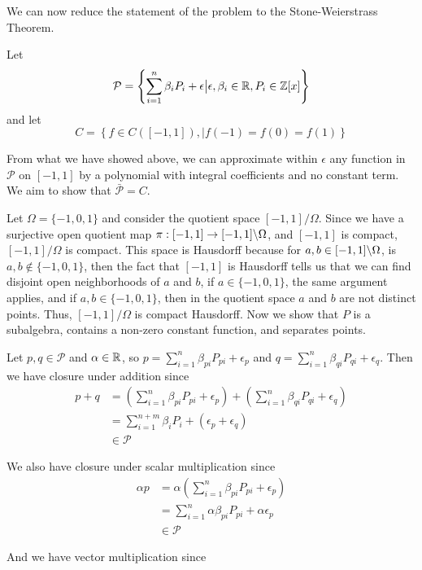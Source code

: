 \documentclass{hmwk}
\begin{document}
\begin{solution}
\pre We can now reduce the statement of the problem to the Stone-Weierstrass Theorem. 

\pre Let $$\mathcal{P} = \left\{\sum_{i = 1}^n \beta_iP_i + \epsilon \big| \epsilon, \beta_i \in \mathbb{R}, P_i \in \mathbb{Z}[x] \right\}$$ 
\pre and let $$C = \left\{ f \in C([-1, 1]), 
\big| f(-1) = f(0) = f(1)\right\}$$

\pre From what we have showed above, we can approximate within $\epsilon$ any function in $\mathcal{P}$ on $[-1, 1]$ by a polynomial with integral coefficients and no constant term. We aim to show that $\bar{\mathcal{P}} = C$.

\pre Let $\Omega = \{-1, 0, 1\}$ and consider the quotient space $[-1, 1]/\Omega$. Since we have a surjective open quotient map $\pi: [-1, 1] \rightarrow [-1, 1]\backslash\Omega$, and $[-1, 1]$ is compact, $[-1, 1]/\Omega$ is compact. This space is Hausdorff because for $a, b \in [-1, 1]\backslash\Omega$, is $a, b \notin \{-1, 0, 1\}$, then the fact that $[-1, 1]$ is Hausdorff tells us that we can find disjoint open neighborhoods of $a$ and $b$, if $a \in \{-1, 0, 1\}$, the same argument applies, and if $a, b \in \{-1, 0, 1\}$, then in the quotient space $a$ and $b$ are not distinct points. Thus, $[-1, 1]/\Omega$ is compact Hausdorff. Now we show that $P$ is a subalgebra, contains a non-zero constant function, and separates points. 

\pre Let $p, q \in \mathcal{P}$ and $\alpha \in \mathbb{R}$, so $p = \sum_{i = 1}^n \beta_{pi}P_{pi} + \epsilon_p$ and $q = \sum_{i = 1}^n \beta_{qi}P_{qi} + \epsilon_q$. Then we have closure under addition since
\begin{align*}
    p + q &= \left(\sum_{i = 1}^n \beta_{pi}P_{pi} + \epsilon_p\right) + \left(\sum_{i = 1}^n \beta_{qi}P_{qi} + \epsilon_q\right) \\
    &= \sum_{i = 1}^{n+m}\beta_iP_i + (\epsilon_p + \epsilon_q) \\
    &\in \mathcal{P}
\end{align*} 

\pre We also have closure under scalar multiplication since 
\begin{align*}
    \alpha p &= \alpha\left(\sum_{i = 1}^n \beta_{pi}P_{pi} + \epsilon_p\right) \\
    &= \sum_{i = 1}^n \alpha\beta_{pi}P_{pi} + \alpha\epsilon_p \\
    &\in \mathcal{P}
\end{align*}

\pre And we have vector multiplication since


\end{solution}
\end{document}

